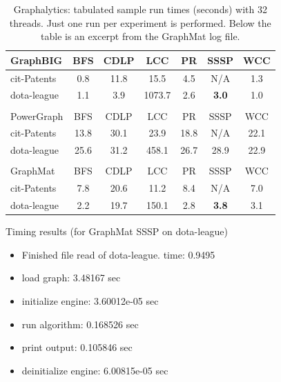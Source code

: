\documentclass[conference]{IEEEtran}
\begin{document}
\begin{table}
	\caption{Graphalytics: tabulated sample run times (seconds) with 32 threads. Just one run per experiment is performed. Below the table is an excerpt from the GraphMat log file.}
		\label{tab:graphalytics-realworld}
	\vspace{-10pt}
	\begin{center}
	\begin{tabular}{l|c|c|c|c|c|c}
	GraphBIG & BFS  & CDLP  &   LCC   &  PR &  SSSP & WCC \\ \hline
	cit-Patents & 0.8 & 11.8 & 15.5  &  4.5 & N/A  & 1.3 \\
	dota-league & 1.1 & 3.9 & 1073.7 &  2.6 & \textbf{3.0} & 1.0 \\
	\multicolumn{1}{l}{}\\
	PowerGraph & BFS  & CDLP  &   LCC   &  PR &  SSSP & WCC \\ \hline
	cit-Patents & 13.8 & 30.1 & 23.9 & 18.8 & N/A & 22.1 \\
	dota-league & 25.6 & 31.2 & 458.1 & 26.7 & 28.9 & 22.9 \\
	\multicolumn{1}{l}{}\\
	GraphMat & BFS  & CDLP  &   LCC   &  PR &  SSSP & WCC \\ \hline
	cit-Patents & 7.8 & 20.6 & 11.2 &  8.4 & N/A &  7.0 \\
	dota-league & 2.2 & 19.7 & 150.1 & 2.8 & \textbf{3.8} & 3.1\\ \hline
	\end{tabular}
	\end{center}
\noindent Timing results (for GraphMat SSSP on dota-league)
	\begin{itemize}
		\item Finished file read of dota-league. time: 0.9495
		\item load graph: 3.48167 sec
		\item initialize engine: 3.60012e-05 sec
		\item run algorithm: 0.168526 sec
		\item print output: 0.105846 sec
		\item deinitialize engine: 6.00815e-05 sec
	\end{itemize}
\end{table}
\end{document}
